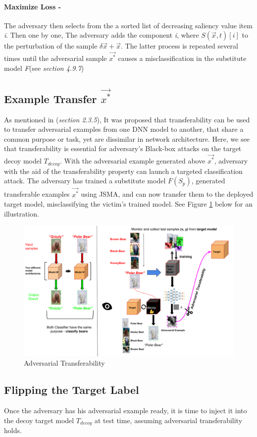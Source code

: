 \documentclass[grad,lot,lof,11pt,oneside,onehalfspace]{RUthesis}
\begin{document}
\paragraph{Maximize Loss -} The adversary then selects from the a sorted list of decreasing saliency value item \textit{i}.  Then one by one, The adversary adds the component \textit{i}, where $S(\vec{x}, \textit{t})[i]$ to the perturbation of the sample $\delta\vec{x} + \vec{x}$.  The latter process is repeated several times until the adversarial sample $\vec{x^{*}}$ causes a misclassification in the substitute model \textit{F}(see \textit{section 4.9.7})
\subsection{Example Transfer \textbf{$\vec{x^{*}}$}}
As mentioned in (\textit{section 2.3.5}), It was proposed that transferability can be used to transfer adversarial examples from one DNN model to another, that share a common purpose or task, yet are dissimilar in network architecture. Here, we see that transferability is essential for adversary's Black-box attacks on the target decoy model \textit{$T_{decoy}$}. With the adversarial example generated above $\vec{x^{*}}$, adversary with the aid of the transferability property can launch a targeted classification attack. The adversary has trained a substitute model \textit{$F(S_{p})$}, generated transferable examples \textit{$\vec{x^{*}}$} using JSMA, and can now transfer them to the deployed target model, misclassifying the victim's trained model. See Figure \ref*{fig:Transferability} below for an illustration. 
\begin{figure}[h]
\centering
\includegraphics[width=0.7\linewidth]{"Images/Chapter 4/Transferability"}
\caption{Adversarial Transferability}
\label{fig:Transferability}
\end{figure}

\subsection{Flipping the Target Label}
Once the adversary has his adversarial example ready, it is time to inject it into the decoy target model \textit{$T_{decoy}$} at test time, assuming adversarial transferability holds.
\end{document}

